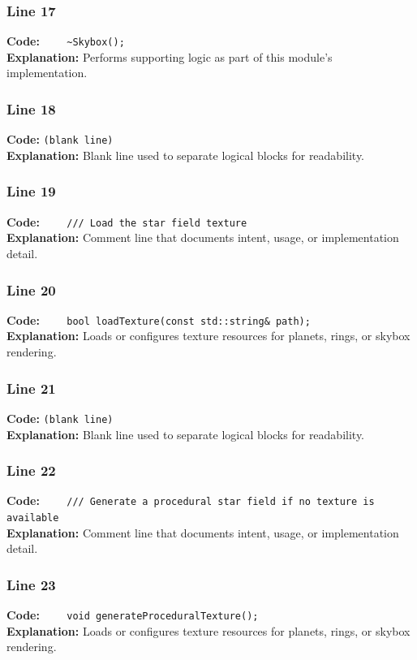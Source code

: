 \documentclass[11pt,a4paper]{article}
\begin{document}
\subsubsection*{Line 17}
\textbf{Code:} \verb|    ~Skybox();|\\
\textbf{Explanation:} Performs supporting logic as part of this module's implementation.

\subsubsection*{Line 18}
\textbf{Code:} \texttt{(blank line)}\\
\textbf{Explanation:} Blank line used to separate logical blocks for readability.

\subsubsection*{Line 19}
\textbf{Code:} \verb|    /// Load the star field texture|\\
\textbf{Explanation:} Comment line that documents intent, usage, or implementation detail.

\subsubsection*{Line 20}
\textbf{Code:} \verb|    bool loadTexture(const std::string& path);|\\
\textbf{Explanation:} Loads or configures texture resources for planets, rings, or skybox rendering.

\subsubsection*{Line 21}
\textbf{Code:} \texttt{(blank line)}\\
\textbf{Explanation:} Blank line used to separate logical blocks for readability.

\subsubsection*{Line 22}
\textbf{Code:} \verb|    /// Generate a procedural star field if no texture is available|\\
\textbf{Explanation:} Comment line that documents intent, usage, or implementation detail.

\subsubsection*{Line 23}
\textbf{Code:} \verb|    void generateProceduralTexture();|\\
\textbf{Explanation:} Loads or configures texture resources for planets, rings, or skybox rendering.
\end{document}
